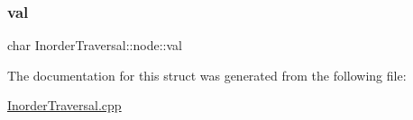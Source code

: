 \subsubsection{\texorpdfstring{val}{val}}
{\footnotesize\ttfamily char Inorder\+Traversal\+::node\+::val}



The documentation for this struct was generated from the following file\+:\begin{DoxyCompactItemize}
\item 
\mbox{\hyperlink{_inorder_traversal_8cpp}{Inorder\+Traversal.\+cpp}}\end{DoxyCompactItemize}
